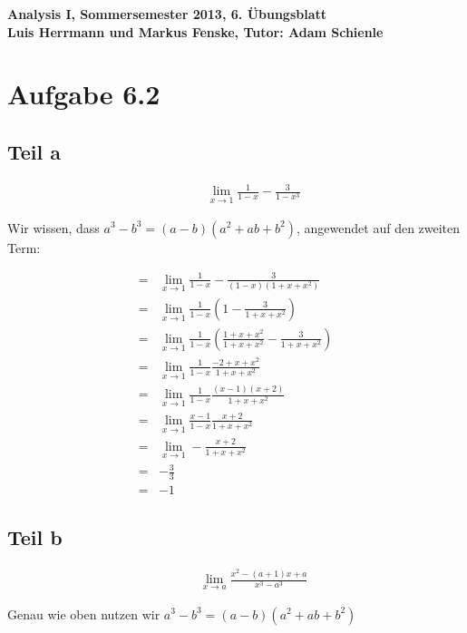\documentclass[a4paper,german,12pt,smallheadings]{scrartcl}
\begin{document}
\begin{center}
\bfseries %
\sffamily %
\vspace{-40pt}
Analysis I, Sommersemester 2013, 6. Übungsblatt \\
Luis Herrmann und Markus Fenske, Tutor: Adam Schienle
\vspace{-10pt}
\end{center}

\section*{Aufgabe 6.2}
\subsection*{Teil a}

\begin{align*}
  \qquad&\lim_{x \to 1} \frac{1}{1-x} - \frac{3}{1-x^3}
\end{align*}

Wir wissen, dass $a^3 - b^3 = (a-b)(a^2 + ab + b^2)$, angewendet auf den zweiten Term:

\begin{align*}
  = &\lim_{x \to 1} \frac{1}{1-x} - \frac{3}{(1-x)(1+x+x^2)} \\
  = &\lim_{x \to 1} \frac{1}{1-x} \left(1 - \frac{3}{1+x+x^2}\right) \\
  = &\lim_{x \to 1} \frac{1}{1-x} \left(\frac{1+x+x^2}{1+x+x^2} - \frac{3}{1+x+x^2}\right) \\
  = &\lim_{x \to 1} \frac{1}{1-x} \frac{-2+x+x^2}{1+x+x^2} \\
  = &\lim_{x \to 1} \frac{1}{1-x} \frac{(x-1)(x+2)}{1+x+x^2} \\
  = &\lim_{x \to 1} \frac{x-1}{1-x} \frac{x+2}{1+x+x^2} \\
  = &\lim_{x \to 1} -\frac{x+2}{1+x+x^2} \\
  = &-\frac{3}{3} \\
  = &-1
\end{align*}


\subsection*{Teil b}

\begin{align*}
  \qquad&\lim_{x \to a} \frac{x^2 - (a+1)x + a}{x^3 - a^3}
\end{align*}

Genau wie oben nutzen wir $a^3 - b^3 = (a-b)(a^2 + ab + b^2)$
\end{document}
